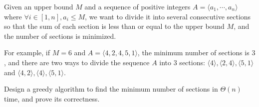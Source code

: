 
Given an upper bound \(M\) and a sequence of positive integers \(A=\langle a_1,\cdots,a_n\rangle\) where \(\forall i \in [1, n], a_i \leq M\), we want to divide it into several consecutive sections so that the sum of each section is less than or equal to the upper bound \(M\), and the number of sections is minimized.

For example, if \(M=6\) and \(A=\langle 4,2,4,5,1\rangle\), the minimum number of sections is \(3\), and there are two ways to divide the sequence \(A\) into \(3\) sections: \(\langle 4\rangle,\langle 2,4\rangle,\langle 5,1\rangle\) and \(\langle 4,2\rangle,\langle 4\rangle,\langle 5,1\rangle\).

Design a greedy algorithm to find the minimum number of sections in \(\Theta(n)\) time, and prove its correctness.

